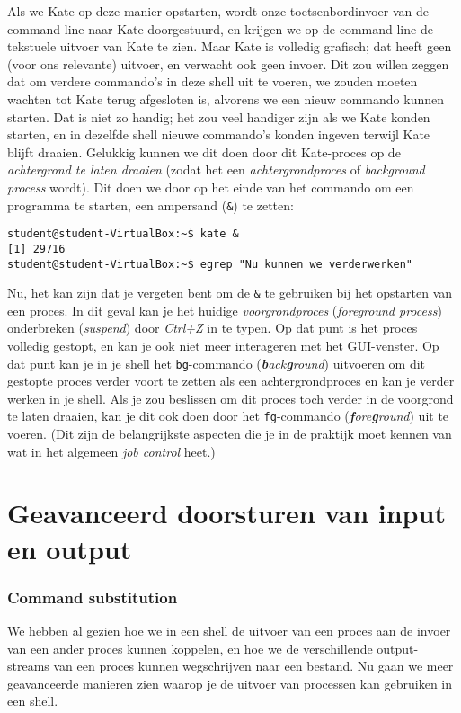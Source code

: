 \documentclass[a4paper,twoside,openany]{memoir}
\begin{document}
Als we Kate op deze manier opstarten, wordt onze toetsenbordinvoer van de
command line naar Kate doorgestuurd, en krijgen we op de command line de
tekstuele uitvoer van Kate te zien. Maar Kate is volledig grafisch; dat heeft
geen (voor ons relevante) uitvoer, en verwacht ook geen invoer. Dit zou willen
zeggen dat om verdere commando's in deze shell uit te voeren, we zouden moeten
wachten tot Kate terug afgesloten is, alvorens we een nieuw commando kunnen
starten. Dat is niet zo handig; het zou veel handiger zijn als we Kate konden
starten, en in dezelfde shell nieuwe commando's konden ingeven terwijl Kate
blijft draaien. Gelukkig kunnen we dit doen door dit Kate-proces op de
\emph{achtergrond te laten draaien} (zodat het een \emph{achtergrondproces} of
\emph{background process} wordt). Dit doen we door op het einde van het
commando om een programma te starten, een ampersand (\verb!&!) te zetten:

\begin{verbatim}
student@student-VirtualBox:~$ kate &
[1] 29716
student@student-VirtualBox:~$ egrep "Nu kunnen we verderwerken"
\end{verbatim}

Nu, het kan zijn dat je vergeten bent om de \verb!&! te gebruiken bij het
opstarten van een proces. In dit geval kan je het huidige
\emph{voorgrondproces} (\emph{foreground process}) onderbreken (\emph{suspend})
door \emph{Ctrl+Z} in te typen. Op dat punt is het proces volledig gestopt, en
kan je ook niet meer interageren met het GUI-venster. Op dat punt kan je in je
shell het \verb!bg!-commando (\emph{\textbf{b}ack\textbf{g}round}) uitvoeren om
dit gestopte proces verder voort te zetten als een achtergrondproces en kan je
verder werken in je shell. Als je zou beslissen om dit proces toch verder in de
voorgrond te laten draaien, kan je dit ook doen door het \verb!fg!-commando
(\emph{\textbf{f}ore\textbf{g}round}) uit te voeren. (Dit zijn de belangrijkste
aspecten die je in de praktijk moet kennen van wat in het algemeen \emph{job
control} heet.)

\chapter{Geavanceerd doorsturen van input en output}
\subsection{Command substitution}

We hebben al gezien hoe we in een shell de uitvoer van een proces aan de invoer
van een ander proces kunnen koppelen, en hoe we de verschillende output-streams
van een proces kunnen wegschrijven naar een bestand. Nu gaan we meer
geavanceerde manieren zien waarop je de uitvoer van processen kan gebruiken in
een shell.
\end{document}
